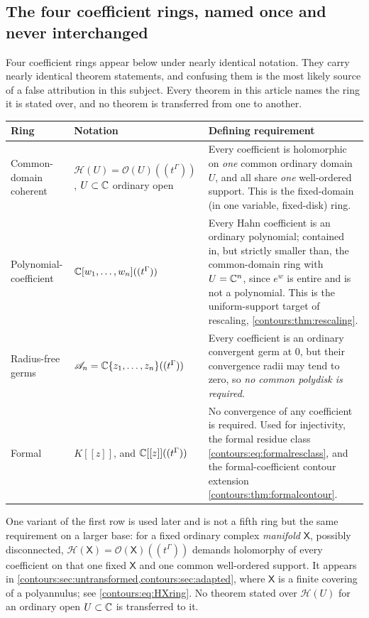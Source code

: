 \documentclass[11pt,letterpaper]{article}
\theoremstyle{definition}
\theoremstyle{remark}
\newcommand{\HH}{\mathcal H}\newcommand{\A}{\mathscr A}\newcommand{\OO}{\mathcal O}
\numberwithin{equation}{section}
\begin{document}
\subsection{The four coefficient rings, named once and never interchanged}
\label{contours:subsec:rings}
Four coefficient rings appear below under nearly identical notation. They carry
nearly identical theorem statements, and confusing them is the most likely source
of a false attribution in this subject. Every theorem in this article names the
ring it is stated over, and no theorem is transferred from one to another.

\begin{center}\small
\begin{longtable}{@{}L{0.20\textwidth}L{0.24\textwidth}L{0.46\textwidth}@{}}
\toprule
Ring & Notation & Defining requirement\\\midrule\endhead
Common-domain coherent & $\HH(U)=\OO(U)((t^\Gamma))$, $U\subset\mathbb C$ ordinary open
  & Every coefficient is holomorphic on \emph{one} common ordinary domain $U$, and
    all share \emph{one} well-ordered support. This is the fixed-domain (in one
    variable, fixed-disk) ring.\\[0.5em]
Polynomial-coefficient & $\mathbb C[w_1,\ldots,w_n]((t^\Gamma))$
  & Every Hahn coefficient is an ordinary polynomial; contained in, but
    strictly smaller than, the common-domain ring with $U=\mathbb C^n$, since
    $e^{w}$ is entire and is not a polynomial. This is the uniform-support target of
    rescaling, \cref{contours:thm:rescaling}.\\[0.5em]
Radius-free germs & $\A_n=\C\{z_1,\ldots,z_n\}((t^\Gamma))$
  & Every coefficient is an ordinary convergent germ at $0$, but their convergence
    radii may tend to zero, so \emph{no common polydisk is required}.\\[0.5em]
Formal & $K[[z]]$, and $\mathbb C[[z]]((t^\Gamma))$
  & No convergence of any coefficient is required. Used for injectivity, the formal
    residue class \eqref{contours:eq:formalresclass}, and the formal-coefficient
    contour extension \cref{contours:thm:formalcontour}.\\
\bottomrule
\end{longtable}
\end{center}

One variant of the first row is used later and is not a fifth ring but the same
requirement on a larger base: for a fixed ordinary complex \emph{manifold}
$\mathsf X$, possibly disconnected, $\HH(\mathsf X)=\OO(\mathsf X)((t^\Gamma))$
demands holomorphy of every coefficient on that one fixed $\mathsf X$ and one
common well-ordered support. It appears in
\cref{contours:sec:untransformed,contours:sec:adapted}, where $\mathsf X$ is a
finite covering of a polyannulus; see \eqref{contours:eq:HXring}. No theorem
stated over $\HH(U)$ for an ordinary open $U\subset\mathbb C$ is transferred to it.
\end{document}
